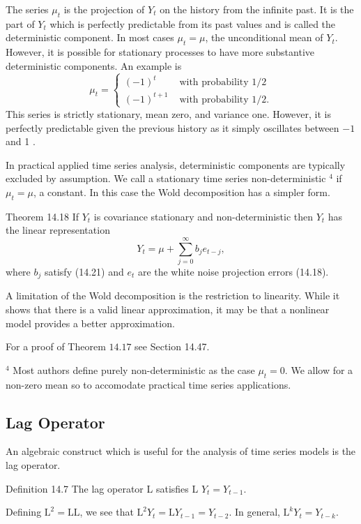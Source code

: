 \documentclass[10pt]{article}
\begin{document}
The series $\mu_{t}$ is the projection of $Y_{t}$ on the history from the infinite past. It is the part of $Y_{t}$ which is perfectly predictable from its past values and is called the deterministic component. In most cases $\mu_{t}=\mu$, the unconditional mean of $Y_{t}$. However, it is possible for stationary processes to have more substantive deterministic components. An example is
$$
\mu_{t}=\left\{\begin{array}{cc}
(-1)^{t} & \text { with probability } 1 / 2 \\
(-1)^{t+1} & \text { with probability } 1 / 2 .
\end{array}\right.
$$
This series is strictly stationary, mean zero, and variance one. However, it is perfectly predictable given the previous history as it simply oscillates between $-1$ and 1 .

In practical applied time series analysis, deterministic components are typically excluded by assumption. We call a stationary time series non-deterministic ${ }^{4}$ if $\mu_{t}=\mu$, a constant. In this case the Wold decomposition has a simpler form.

Theorem 14.18 If $Y_{t}$ is covariance stationary and non-deterministic then $Y_{t}$ has the linear representation
$$
Y_{t}=\mu+\sum_{j=0}^{\infty} b_{j} e_{t-j},
$$
where $b_{j}$ satisfy (14.21) and $e_{t}$ are the white noise projection errors (14.18).

A limitation of the Wold decomposition is the restriction to linearity. While it shows that there is a valid linear approximation, it may be that a nonlinear model provides a better approximation.

For a proof of Theorem $14.17$ see Section 14.47.

${ }^{4}$ Most authors define purely non-deterministic as the case $\mu_{t}=0$. We allow for a non-zero mean so to accomodate practical time series applications.

\subsection{Lag Operator}
An algebraic construct which is useful for the analysis of time series models is the lag operator.

Definition 14.7 The lag operator L satisfies L $Y_{t}=Y_{t-1}$.

Defining $\mathrm{L}^{2}=\mathrm{LL}$, we see that $\mathrm{L}^{2} Y_{t}=\mathrm{L} Y_{t-1}=Y_{t-2}$. In general, $\mathrm{L}^{k} Y_{t}=Y_{t-k}$.
\end{document}
